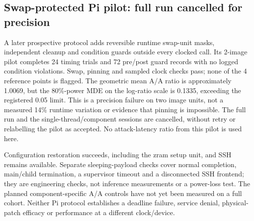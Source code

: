 \subsection{Swap-protected Pi pilot: full run cancelled for precision}
\label{app:seg-pi3b-swapguard}
A later prospective protocol adds reversible runtime swap-unit masks,
independent cleanup and condition guards outside every clocked call. Its
2-image pilot completes 24 timing trials and
72 pre/post guard records with no logged condition violations.
Swap, pinning and sampled clock checks pass; none of the
4 reference points is flagged. The geometric mean A/A ratio
is approximately 1.0069, but the 80\%-power MDE on the
log-ratio scale is 0.1335, exceeding the registered 0.05 limit.
This is a precision failure on two image units, not a measured 14\% runtime
variation or evidence that pinning is impossible. The full run and the
single-thread/component sessions are cancelled, without retry or relabelling
the pilot as accepted. No attack-latency ratio from this pilot is used here.

Configuration restoration succeeds, including the zram setup unit, and SSH
remains available. Separate sleeping-payload checks cover normal completion,
main/child termination, a supervisor timeout and a disconnected SSH frontend;
they are engineering checks, not inference measurements or a power-loss test.
The planned component-specific A/A controls have not yet been measured on a
full cohort. Neither Pi protocol establishes a deadline failure, service
denial, physical-patch efficacy or performance at a different clock/device.
